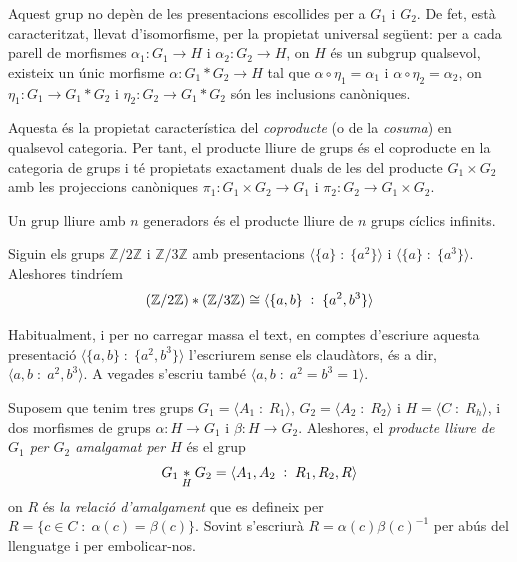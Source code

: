 \documentclass[../main.tex]{subfiles}
\begin{document}
Aquest grup no depèn de les presentacions escollides per a $G_1$ i $G_2$. De fet, està caracteritzat, llevat d'isomorfisme, per la propietat universal següent: per a cada parell de morfismes $\alpha_1:G_1\rightarrow H$ i $\alpha_2:G_2\rightarrow H$, on $H$ és un subgrup qualsevol, existeix un únic morfisme $\alpha:G_1*G_2\rightarrow H$ tal que $\alpha\circ\eta_1 = \alpha_1$ i $\alpha\circ\eta_2 = \alpha_2$, on $\eta_1:G_1\rightarrow G_1*G_2$ i $\eta_2:G_2\rightarrow G_1*G_2$ són les inclusions canòniques.

Aquesta és la propietat característica del \textit{coproducte} (o de la \textit{cosuma}) en qualsevol categoria. Per tant, el producte lliure de grups és el coproducte en la categoria de grups i té propietats exactament duals de les del producte $G_1\times G_2$ amb les projeccions canòniques $\pi_1:G_1\times G_2\rightarrow G_1$ i $\pi_2:G_2\rightarrow G_1\times G_2$.

Un grup lliure amb $n$ generadors és el producte lliure de $n$ grups cíclics infinits.

\begin{ej}
Siguin els grups $\mathbb{Z}/2\mathbb{Z}$ i $\mathbb{Z}/3\mathbb{Z}$ amb presentacions $\langle\{a\}\;:\;\{a^2\}\rangle$ i $\langle \{a\}\;:\;\{a^3\}\rangle$. Aleshores tindríem
\begin{equation}
    \notag
    (\mathbb{Z}/2\mathbb{Z})*(\mathbb{Z}/3\mathbb{Z}) \cong \langle\{a,b\}\;:\;\{a^2,b^3\}\rangle
\end{equation}
\end{ej}

\begin{nota}
Habitualment, i per no carregar massa el text, en comptes d'escriure aquesta presentació $\langle\{a,b\}\;:\;\{a^2,b^3\}\rangle$ l'escriurem sense els claudàtors, és a dir, $\langle a,b\;:\;a^2,b^3\rangle$. A vegades s'escriu també $\langle a,b\;:\;a^2=b^3=1\rangle$.
\end{nota}

\begin{defi}
\label{def:productelliureamalgamat} Suposem que tenim tres grups $G_1 = \langle A_1\;:\;R_1\rangle$, $G_2 = \langle A_2\;:\;R_2\rangle$ i $H = \langle C\;:\;R_h\rangle$, i dos morfismes de grups $\alpha:H\rightarrow G_1$ i $\beta:H\rightarrow G_2$. Aleshores, el \textit{producte lliure de $G_1$ per $G_2$ amalgamat per $H$} és el grup
\begin{equation}
    \notag
    G_1\underset{H}{*}G_2 = \langle A_1,A_2\;:\;R_1,R_2,R\rangle
\end{equation}
on $R$ és \textit{la relació d'amalgament} que es defineix per $R = \{c\in C\;:\;\alpha(c) = \beta(c)\}$. Sovint s'escriurà $R = \alpha(c)\beta(c)^{-1}$ per abús del llenguatge i per embolicar-nos.
\end{defi}
\end{document}
